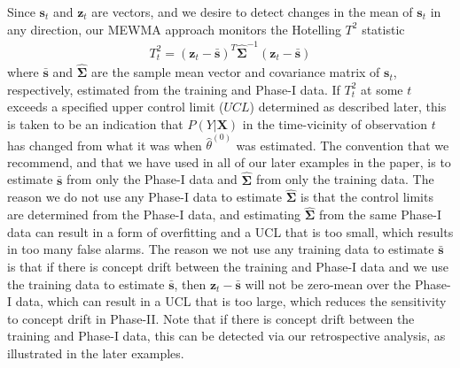 \documentclass[twoside,11pt]{article}
\begin{document}
Since $\bm{s}_t$ and $\bm{z}_t$ are vectors, and we desire to detect changes in the mean of $\bm{s}_t$ in any direction, our MEWMA approach monitors the Hotelling $T^2$ statistic 
\begin{align}
T_t^2 = (\bm {z}_t-\bar { \bm {s}})^T \hat {\bm { \Sigma}} ^{-1}(\bm {z}_t-\bar { \bm {s}})
\label{eqn:hotellingt2}
\end{align}
where $\bar {\bm{s}}$ and $\hat {\bm {\Sigma}}$ are the sample mean vector and covariance matrix of $\bm {s}_t$, respectively, estimated from the training and Phase-I data. If $T_t^2$ at some $t$ exceeds a specified upper control limit ($UCL$) determined as described later, this is taken to be an indication that $P(Y|\bm{X})$ in the time-vicinity of observation $t$ has changed from what it was when $\hat{\theta}^{(0)}$ was estimated. The convention that we recommend, and that we have used in all of our later examples in the paper, is to estimate $\bar {\bm{s}}$ from only the Phase-I data and $\hat {\bm {\Sigma}}$ from only the training data. The reason we do not use any Phase-I data to estimate $\hat {\bm {\Sigma}}$ is that the control limits are determined from the Phase-I data, and estimating $\hat {\bm {\Sigma}}$ from the same Phase-I data can result in a form of overfitting and a UCL that is too small, which results in too many false alarms. The reason we not use any training data to estimate $\bar {\bm{s}}$ is that if there is concept drift between the training and Phase-I data and we use the training data to estimate $\bar { \bm {s}}$, then $\bm {z}_t-\bar { \bm {s}}$ will not be zero-mean over the Phase-I data, which can result in a UCL that is too large, which reduces the sensitivity to concept drift in Phase-II. Note that if there is concept drift between the training and Phase-I data, this can be detected via our retrospective analysis, as illustrated in the later examples. 
\end{document}
